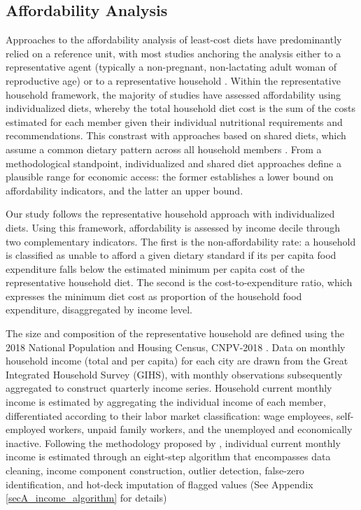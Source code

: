 \documentclass[Afour, sageh,times]{sagej}
\begin{document}
\smallskip

\subsection{Affordability Analysis}

Approaches to the affordability analysis of least-cost diets have predominantly relied on a reference unit, with most studies anchoring the analysis either to a representative agent (typically a non-pregnant, non-lactating adult woman of reproductive age) or to a representative household \citep{Herforth2020, FAO2022SOFI, Frega2012, Biehl2016}. Within the representative household framework, the majority of studies have assessed affordability using individualized diets, whereby the total household diet cost is the sum of the costs estimated for each member given their individual nutritional requirements and recommendations. This constrast with approaches based on shared diets, which assume a common dietary pattern across all household members \citep{Schneider2021}. From a methodological standpoint, individualized and shared diet approaches define a plausible range for economic access: the former establishes a lower bound on affordability indicators, and the latter an upper bound. 

\smallskip

Our study follows the representative household approach with individualized diets. Using this framework, affordability is assessed by income decile through two complementary indicators. The first is the non-affordability rate: a household is classified as unable to afford a given dietary standard if its per capita food expenditure falls below the estimated minimum per capita cost of the representative household diet. The second is the cost-to-expenditure ratio, which expresses the minimum diet cost as proportion of the household food expenditure, disaggregated by income level.

\smallskip

The size and composition of the representative household are defined using the 2018 National Population and Housing Census, CNPV-2018 \cite{DANE2018CNPV}. Data on monthly household income (total and per capita) for each city are drawn from the Great Integrated Household Survey (GIHS), with monthly observations subsequently aggregated to construct quarterly income series. Household current monthly income is estimated by aggregating the individual income of each member, differentiated according to their labor market classification: wage employees, self-employed workers, unpaid family workers, and the unemployed and economically inactive. Following the methodology proposed by \cite{DANEIngreso}, individual current monthly income is estimated through an eight-step algorithm that encompasses data cleaning, income component construction, outlier detection, false-zero identification, and hot-deck imputation of flagged values (See Appendix \ref{secA_income_algorithm} for details)
\end{document}
